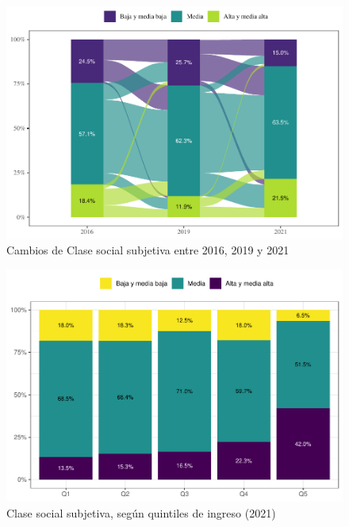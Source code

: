 \documentclass[
  12pt,
]{book}
\begin{document}
\begin{figure}

{\centering \includegraphics{reporte-elsoc_files/figure-latex/ess-cambio-1} 

}

\caption{Cambios de Clase social subjetiva entre 2016, 2019 y 2021}\label{fig:ess-cambio}
\end{figure}

\begin{figure}

{\centering \includegraphics{reporte-elsoc_files/figure-latex/ess-quintil-1} 

}

\caption{Clase social subjetiva, según quintiles de ingreso (2021)}\label{fig:ess-quintil}
\end{figure}
\end{document}

